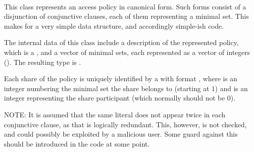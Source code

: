 \documentclass{article}
\begin{document}
\paragraph{\cBLcanonAP}

This class represents an access policy in canonical form. Such forms consist of a disjunction of conjunctive clauses, each of them representing a minimal set. This makes for a very simple data structure, and accordingly simple-ish code.

The internal data of this class include a description of the represented policy, which is a \cstring, and a vector of minimal sets, each represented as a vector of integers (). The resulting type is .

Each share of the policy is uniquely identified by a \cstring with format , where  is an integer numbering the minimal set the share belongs to (starting at $1$) and  is an integer representing the share participant (which normally should not be $0$). 


NOTE: It is assumed that the same literal does not appear twice in each conjunctive clause, as that is logically redundant. This, however, is not checked, and could possibly be exploited by a malicious user. Some guard against this should be introduced in the code at some point.
\end{document}

